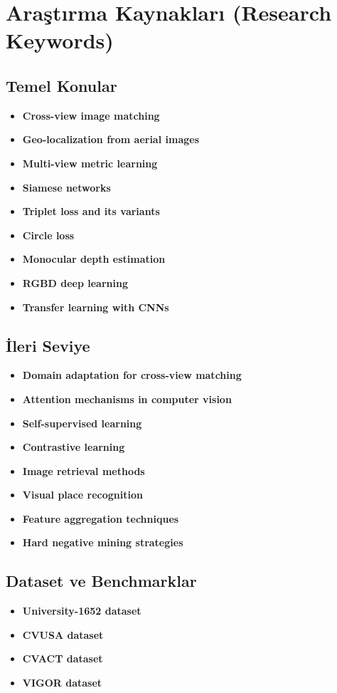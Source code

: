 \documentclass[12pt,a4paper]{article}
\begin{document}
\section{Araştırma Kaynakları (Research Keywords)}

\subsection{Temel Konular}
\begin{itemize}
    \item \textbf{Cross-view image matching}
    \item \textbf{Geo-localization from aerial images}
    \item \textbf{Multi-view metric learning}
    \item \textbf{Siamese networks}
    \item \textbf{Triplet loss and its variants}
    \item \textbf{Circle loss}
    \item \textbf{Monocular depth estimation}
    \item \textbf{RGBD deep learning}
    \item \textbf{Transfer learning with CNNs}
\end{itemize}

\subsection{İleri Seviye}
\begin{itemize}
    \item \textbf{Domain adaptation for cross-view matching}
    \item \textbf{Attention mechanisms in computer vision}
    \item \textbf{Self-supervised learning}
    \item \textbf{Contrastive learning}
    \item \textbf{Image retrieval methods}
    \item \textbf{Visual place recognition}
    \item \textbf{Feature aggregation techniques}
    \item \textbf{Hard negative mining strategies}
\end{itemize}

\subsection{Dataset ve Benchmarklar}
\begin{itemize}
    \item \textbf{University-1652 dataset}
    \item \textbf{CVUSA dataset}
    \item \textbf{CVACT dataset}
    \item \textbf{VIGOR dataset}
\end{itemize}
\end{document}
